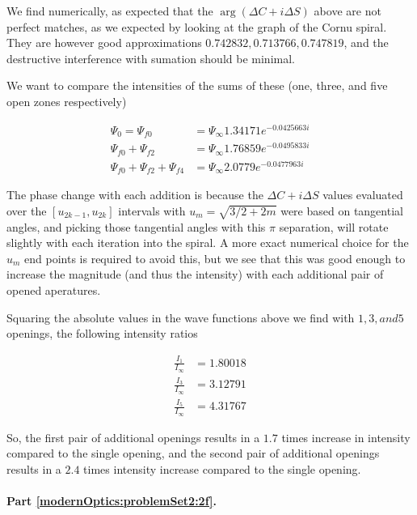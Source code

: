 {We find numerically, as expected that the $\arg(\Delta C + i \Delta S)$ above are not perfect matches, as we expected by looking at the graph of the Cornu spiral.  They are however good approximations $0.742832, 0.713766, 0.747819$, and the destructive interference with sumation should be minimal.

We want to compare the intensities of the sums of these (one, three, and five open zones respectively)

\begin{equation}\label{eqn:modernOptics:ProblemSet2:P2:200}
\begin{aligned}
\Psi_0 = \Psi_{f0} &= \Psi_\infty 1.34171 e^{ -0.0425663 i } \\
\Psi_{f0} + \Psi_{f2} &= \Psi_\infty 1.76859 e^{ -0.0495833 i } \\
\Psi_{f0} + \Psi_{f2} + \Psi_{f4} &= \Psi_\infty 2.0779 e^{ -0.0477963 i }
\end{aligned}
\end{equation}

The phase change with each addition is because the $\Delta C + i \Delta S$ values evaluated over the $[u_{2k-1}, u_{2k}]$ intervals with $u_m = \sqrt{3/2 + 2m}$ were based on tangential angles, and picking those tangential angles with this $\pi$ separation, will rotate slightly with each iteration into the spiral.  A more exact numerical choice for the $u_m$ end points is required to avoid this, but we see that this was good enough to increase the magnitude (and thus the intensity) with each additional pair of opened aperatures.

Squaring the absolute values in the wave functions above we find with $1, 3, and 5$ openings, the following intensity ratios

\begin{equation}\label{eqn:modernOptics:ProblemSet2:P2:220}
\begin{aligned}
\frac{I_{1}}{I_\infty} &= 1.80018 \\
\frac{I_{3}}{I_\infty} &= 3.12791 \\
\frac{I_{5}}{I_\infty} &= 4.31767
\end{aligned}
\end{equation}

So, the first pair of additional openings results in a $1.7$ times increase in intensity compared to the single opening, and the second pair of additional openings results in a $2.4$ times intensity increase compared to the single opening.

\paragraph{Part \ref{modernOptics:problemSet2:2f}.  }

}
